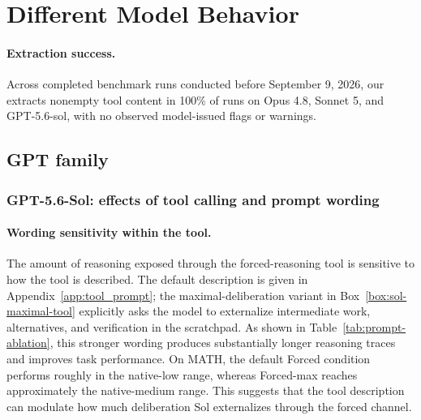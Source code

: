 \section{Different Model Behavior}
\label{app:model-behavior}

\paragraph{Extraction success.}
Across completed benchmark runs conducted before September 9, 2026, our \method{} extracts nonempty tool content in 100\% of runs on Opus 4.8, Sonnet 5, and GPT-5.6-sol, with no observed model-issued flags or warnings.

\subsection{GPT family}
\label{app:gpt-family}

\subsubsection{GPT-5.6-Sol: effects of tool calling and prompt wording}
\label{app:sol-wording}

\paragraph{Wording sensitivity within the tool.}
The amount of reasoning exposed through the forced-reasoning tool is sensitive
to how the tool is described. The default description is given in
Appendix~\ref{app:tool_prompt}; the maximal-deliberation variant in
Box~\ref{box:sol-maximal-tool} explicitly asks the model to externalize
intermediate work, alternatives, and verification in the scratchpad.
As shown in Table~\ref{tab:prompt-ablation}, this stronger wording produces
substantially longer reasoning traces and improves task performance. On MATH,
the default Forced condition performs roughly in the native-low range, whereas
Forced-max reaches approximately the native-medium range. This suggests that
the tool description can modulate how much deliberation Sol externalizes
through the forced channel.


